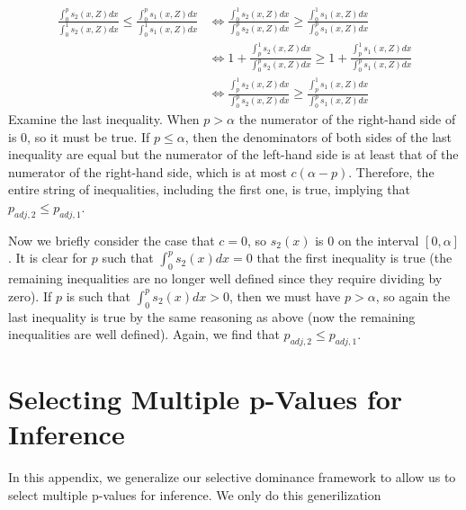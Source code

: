\documentclass{article}
\begin{document}
\begin{appendix}
\begin{align*}
    \frac{\int_0^p s_2(x, Z) dx }{\int_0^1 s_2(x, Z) dx}  \leq \frac{\int_0^p s_1(x, Z) dx }{\int_0^1 s_1(x, Z) dx} &\iff  \frac{\int_0^1 s_2(x, Z) dx}  {\int_0^p s_2(x, Z) dx }\geq \frac{\int_0^1 s_1(x, Z) dx}{\int_0^p s_1(x, Z) dx }\\
    &\iff 1 + \frac{\int_p^1 s_2(x, Z) dx}  {\int_0^p s_2(x, Z) dx }\geq 1 + \frac{\int_p^1 s_1(x, Z) dx}{\int_0^p s_1(x, Z) dx }\\
    &\iff \frac{\int_p^1 s_2(x, Z) dx}  {\int_0^p s_2(x, Z) dx }\geq \frac{\int_p^1 s_1(x, Z) dx}{\int_0^p s_1(x, Z) dx }
\end{align*}
Examine the last inequality. When $p > \alpha$ the numerator of the right-hand side of is $0$, so it must be true. If $p \leq \alpha$, then the denominators of both sides of the last inequality are equal but the numerator of the left-hand side is at least that of the numerator of the right-hand side, which is at most $c(\alpha - p)$. Therefore, the entire string of inequalities, including the first one, is true, implying that $p_{adj, 2} \leq p_{adj, 1}$. 

Now we briefly consider the case that $c=0$, so $s_2(x)$ is $0$ on the interval $[0, \alpha]$. It is clear for $p$ such that $\int_0^p s_2(x)dx = 0$ that the first inequality is true (the remaining inequalities are no longer well defined since they require dividing by zero). If $p$ is such that  $\int_0^p s_2(x)dx > 0$, then we must have $p > \alpha$, so again the last inequality is true by the same reasoning as above (now the remaining inequalities are well defined). Again, we find that $p_{adj, 2} \leq p_{adj, 1}$.

\section{Selecting Multiple p-Values for Inference}
\label{sec:multiple_p_vals_appdx}

In this appendix, we generalize our selective dominance framework to allow us to select multiple p-values for inference. We only do this generilization 


\end{appendix}
\end{document}
